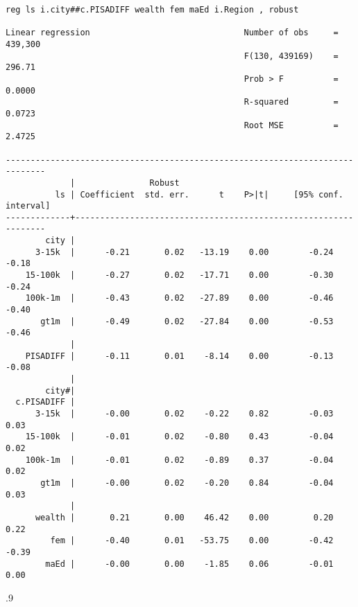 \documentclass[11pt, letterpaper]{article}
\begin{document}
\begin{spacing}{1.9}
\begin{spacing}{.9}
\begin{scriptsize}
\begin{verbatim}
reg ls i.city##c.PISADIFF wealth fem maEd i.Region , robust

Linear regression                               Number of obs     =    439,300
                                                F(130, 439169)    =     296.71
                                                Prob > F          =     0.0000
                                                R-squared         =     0.0723
                                                Root MSE          =     2.4725

------------------------------------------------------------------------------
             |               Robust
          ls | Coefficient  std. err.      t    P>|t|     [95% conf. interval]
-------------+----------------------------------------------------------------
        city |
      3-15k  |      -0.21       0.02   -13.19    0.00        -0.24       -0.18
    15-100k  |      -0.27       0.02   -17.71    0.00        -0.30       -0.24
    100k-1m  |      -0.43       0.02   -27.89    0.00        -0.46       -0.40
       gt1m  |      -0.49       0.02   -27.84    0.00        -0.53       -0.46
             |
    PISADIFF |      -0.11       0.01    -8.14    0.00        -0.13       -0.08
             |
        city#|
  c.PISADIFF |
      3-15k  |      -0.00       0.02    -0.22    0.82        -0.03        0.03
    15-100k  |      -0.01       0.02    -0.80    0.43        -0.04        0.02
    100k-1m  |      -0.01       0.02    -0.89    0.37        -0.04        0.02
       gt1m  |      -0.00       0.02    -0.20    0.84        -0.04        0.03
             |
      wealth |       0.21       0.00    46.42    0.00         0.20        0.22
         fem |      -0.40       0.01   -53.75    0.00        -0.42       -0.39
        maEd |      -0.00       0.00    -1.85    0.06        -0.01        0.00

\end{verbatim}
\end{scriptsize}
\end{spacing}{.9}



\end{spacing}
\end{document}
